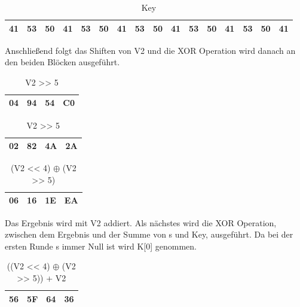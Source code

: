 \documentclass[course=asp]{aspdoc}
\begin{document}
\begin{table}[H]
\centering
    \begin{tabular}{|l|l|l|l||l|l|l|l||l|l|l|l||l|l|l|l|}
        \hline
        41 & 53 & 50 & 41 & 53 & 50 & 41 & 53  & 50 & 41 & 53 & 50 & 41 & 53 & 50 & 41 \\
        \hline
    \end{tabular}
    \caption{Key}
\end{table}


Anschließend folgt das Shiften von V2 und die XOR Operation wird danach an den beiden Blöcken ausgeführt.
\begin{table}[H]

    \begin{minipage}{.5\linewidth}

      \centering
        \begin{tabular}{|l|l|l|l|}
		\hline
            04 & 94 & 54 & C0   \\
		\hline
        \end{tabular}

	\caption{V2 << 4}
    \end{minipage}%
    \begin{minipage}{.5\linewidth}

 \centering

        \begin{tabular}{|l|l|l|l|}
           \hline
		 02 & 82 & 4A & 2A   \\
		\hline
        \end{tabular}
\caption{V2 >> 5}
    \end{minipage}
\end{table}

\begin{table}[H]
\centering
    \begin{tabular}{|l|l|l|l|}
        \hline
        06 & 16 & 1E & EA    \\
        \hline
    \end{tabular}
    \caption{(V2 << 4) $\oplus$ (V2 >> 5)}
\end{table}
Das Ergebnis wird mit V2 addiert. Als nächstes wird die XOR Operation, zwischen dem Ergebnis und der Summe von s und Key, ausgeführt. Da bei der ersten Runde s immer Null ist wird K[0] genommen.
\begin{table}[H]
\centering
    \begin{tabular}{|l|l|l|l|}
        \hline
        56 & 5F & 64 & 36    \\
        \hline
    \end{tabular}
    \caption{((V2 << 4) $\oplus$ (V2 >> 5)) + V2}
\end{table}
\end{document}
